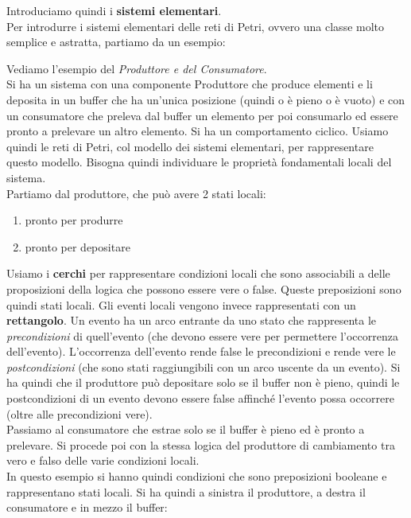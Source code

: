 \documentclass[a4paper,12pt, oneside]{book}
\begin{document}
Introduciamo quindi i \textbf{sistemi elementari}.\\
Per introdurre i sistemi elementari delle reti di Petri, ovvero una classe molto
semplice e astratta, partiamo da un esempio:
\begin{esempio}
  Vediamo l'esempio del \textit{Produttore e del Consumatore}.\\
  Si ha un sistema con una componente Produttore che produce elementi e li
  deposita in un buffer che ha un'unica posizione (quindi o è pieno o è vuoto) e
  con un consumatore che preleva dal buffer un elemento per poi consumarlo ed
  essere pronto a prelevare un altro elemento. Si ha un comportamento
  ciclico. Usiamo quindi le reti di Petri, col modello dei sistemi elementari,
  per rappresentare questo modello. Bisogna quindi individuare le proprietà
  fondamentali locali del sistema.\\
  Partiamo dal produttore, che può avere 2 stati locali:
  \begin{enumerate}
    \item pronto per produrre
    \item pronto per depositare
  \end{enumerate}
  Usiamo i \textbf{cerchi} per rappresentare condizioni locali che sono
  associabili a delle proposizioni della logica che possono essere vere o
  false. Queste preposizioni sono quindi stati locali. Gli eventi locali vengono
  invece rappresentati con un \textbf{rettangolo}. Un evento ha un arco entrante
  da uno stato che rappresenta le \textit{precondizioni} di quell'evento (che
  devono essere vere per permettere l'occorrenza dell'evento). L'occorrenza
  dell'evento rende false le precondizioni e rende vere le
  \textit{postcondizioni} (che sono stati raggiungibili con un arco uscente da
  un evento). Si ha quindi che il produttore può depositare solo se il buffer
  non è pieno, quindi le postcondizioni di un evento devono essere false
  affinché l'evento possa occorrere (oltre alle precondizioni vere).\\
  Passiamo al consumatore che estrae solo se il buffer è pieno ed è pronto a
  prelevare. Si procede poi con la stessa logica del produttore di cambiamento
  tra vero e falso delle varie condizioni locali.\\
  In questo esempio si hanno quindi condizioni che sono preposizioni booleane e
  rappresentano stati locali. Si ha quindi a sinistra il produttore, a destra il
  consumatore e in mezzo il buffer:
  \begin{center}
\end{center}
\end{esempio}
\end{document}
